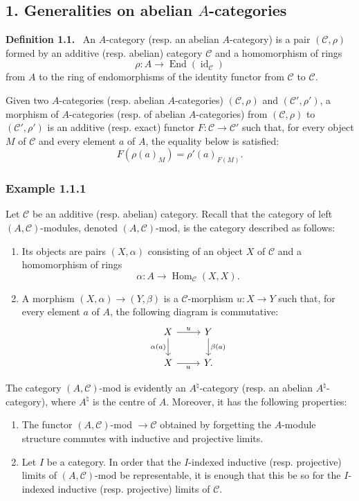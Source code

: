 \documentclass[11pt]{article}
\newenvironment{statement}[1]{\par\medskip\noindent\textbf{#1.}\ }{\par\medskip}
\DeclareMathOperator{\Hom}{Hom}
\providecommand{\id}{\operatorname{id}}
\providecommand{\Hom}{\operatorname{Hom}}
\providecommand{\cC}{\mathcal C}
\providecommand{\End}{\operatorname{End}}
\providecommand{\id}{\operatorname{id}}
\providecommand{\id}{\operatorname{id}}
\providecommand{\End}{\operatorname{End}}
\providecommand{\id}{\operatorname{id}}
\providecommand{\id}{\operatorname{id}}
\providecommand{\cC}{\mathcal C}
\providecommand{\Hom}{\operatorname{Hom}}
\providecommand{\id}{\operatorname{id}}
\begin{document}
\subsection*{1. Generalities on abelian $A$-categories}\label{sga5:V:subsection:1}

\label{sga5:V:definition:1.1}\begin{statement}{Definition 1.1}
An $A$-category (resp. an abelian $A$-category) is a pair $(\cC,\rho)$ formed by an additive (resp. abelian) category $\cC$ and a homomorphism of rings
\[
\rho:A\longrightarrow \End(\id_{\cC})
\]
from $A$ to the ring of endomorphisms of the identity functor from $\cC$ to $\cC$.
\end{statement}

Given two $A$-categories (resp. abelian $A$-categories) $(\cC,\rho)$ and $(\cC',\rho')$, a morphism of $A$-categories (resp. of abelian $A$-categories) from $(\cC,\rho)$ to $(\cC',\rho')$ is an additive (resp. exact) functor $F:\cC\to\cC'$ such that, for every object $M$ of $\cC$ and every element $a$ of $A$, the equality below is satisfied:
\[
F(\rho(a)_M)=\rho'(a)_{F(M)}.
\]

\subsubsection*{Example 1.1.1}\label{sga5:V:example:1.1.1}
Let $\cC$ be an additive (resp. abelian) category. Recall that the category of left $(A,\cC)$-modules, denoted $(A,\cC)$-mod, is the category described as follows:
\begin{enumerate}[label=(\roman*)]
\item Its objects are pairs $(X,\alpha)$ consisting of an object $X$ of $\cC$ and a homomorphism of rings
\[
\alpha:A\longrightarrow \Hom_{\cC}(X,X).
\]
\item A morphism $(X,\alpha)\to(Y,\beta)$ is a $\cC$-morphism $u:X\to Y$ such that, for every element $a$ of $A$, the following diagram is commutative:
\[
\begin{tikzcd}
X \arrow[r,"u"] \arrow[d,"\alpha(a)"'] & Y \arrow[d,"\beta(a)"]\\
X \arrow[r,"u"'] & Y .
\end{tikzcd}
\]
\end{enumerate}
The category $(A,\cC)$-mod is evidently an $A^{\natural}$-category (resp. an abelian $A^{\natural}$-category), where $A^{\natural}$ is the centre of $A$. Moreover, it has the following properties:
\begin{enumerate}[label=(\alph*)]
\item The functor $(A,\cC)$-mod $\to\cC$ obtained by forgetting the $A$-module structure commutes with inductive and projective limits.
\item Let $I$ be a category. In order that the $I$-indexed inductive (resp. projective) limits of $(A,\cC)$-mod be representable, it is enough that this be so for the $I$-indexed inductive (resp. projective) limits of $\cC$.
\end{enumerate}
\end{document}
